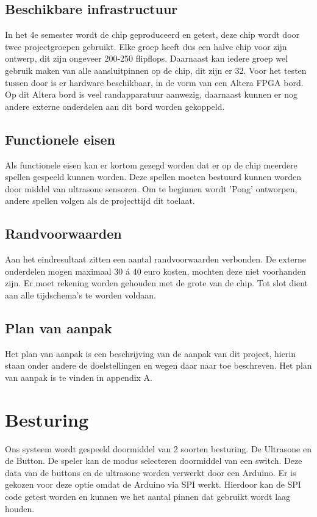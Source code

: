 \documentclass[oneside,dutch]{tudelft-report}
\begin{document}
\section{Beschikbare infrastructuur}
In het 4e semester wordt de chip geproduceerd en getest, deze chip wordt door twee projectgroepen gebruikt. Elke groep heeft dus een halve chip voor zijn ontwerp, dit zijn ongeveer 200-250 flipflops. Daarnaast kan iedere groep wel gebruik maken van alle aansluitpinnen op de chip, dit zijn er 32. Voor het testen tussen door is er hardware beschikbaar, in de vorm van een Altera FPGA bord. Op dit Altera bord is veel randapparatuur aanwezig, daarnaast kunnen er nog andere externe onderdelen aan dit bord worden gekoppeld. 

\section{Functionele eisen}
Als functionele eisen kan er kortom gezegd worden dat er op de chip meerdere spellen gespeeld kunnen worden. Deze spellen moeten bestuurd kunnen worden door middel van ultrasone sensoren. Om te beginnen wordt 'Pong' ontworpen, andere spellen volgen als de projecttijd dit toelaat.

\section{Randvoorwaarden}
Aan het eindresultaat zitten een aantal randvoorwaarden verbonden. De externe onderdelen mogen maximaal 30 á 40 euro kosten, mochten deze niet voorhanden zijn. Er moet rekening worden gehouden met de grote van de chip. Tot slot dient aan alle tijdschema's te worden voldaan.

\section{Plan van aanpak}
Het plan van aanpak is een beschrijving van de aanpak van dit project, hierin staan onder andere de doelstellingen en wegen daar naar toe beschreven. Het plan van aanpak is te vinden in appendix A.

\chapter{Besturing}
Ons systeem wordt gespeeld doormiddel van 2 soorten besturing. De Ultrasone en de Button. De speler kan de modus selecteren doormiddel van een switch. Deze data van de buttons en de ultrasone worden verwerkt door een Arduino. Er is gekozen voor deze optie omdat de Arduino via SPI werkt. Hierdoor kan de SPI code getest worden en kunnen we het aantal pinnen dat gebruikt wordt laag houden. 
\end{document}
